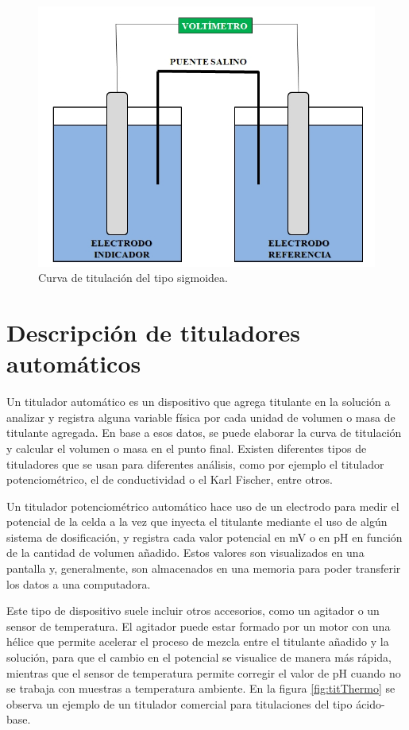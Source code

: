 \begin{figure}[htbp]
	\centering
	\includegraphics[width=.5\textwidth]{./Figures/Potenciometria-img.jpg}
	\caption{Curva de titulación del tipo sigmoidea\protect\footnotemark.}
	\label{fig:potenciometria}
\end{figure}

\section{Descripción de tituladores automáticos}
\label{tituladoresAutomaticos}

Un titulador automático es un dispositivo que agrega titulante en la solución a analizar y registra alguna variable física por cada unidad de volumen o masa de titulante agregada. En base a esos datos, se puede elaborar la curva de titulación y calcular el volumen o masa en el punto final.
Existen diferentes tipos de tituladores que se usan para diferentes análisis, como por ejemplo el titulador potenciométrico, el de conductividad o el Karl Fischer, entre otros.

Un titulador potenciométrico automático hace uso de un electrodo para medir el potencial de la celda a la vez que inyecta el titulante mediante el uso de algún sistema de dosificación, y registra cada valor potencial en mV o en pH en función de la cantidad de volumen añadido. Estos valores son visualizados en una pantalla y, generalmente, son almacenados en una memoria para poder transferir los datos a una computadora. 

Este tipo de dispositivo suele incluir otros accesorios, como un agitador o un sensor de temperatura. El agitador puede estar formado por un motor con una hélice que permite acelerar el proceso de mezcla entre el titulante añadido y la solución, para que el cambio en el potencial se visualice de manera más rápida, mientras que el sensor de temperatura permite corregir el valor de pH cuando no se trabaja con muestras a temperatura ambiente. En la figura \ref{fig:titThermo} se observa un ejemplo de un titulador comercial para titulaciones del tipo ácido-base.

